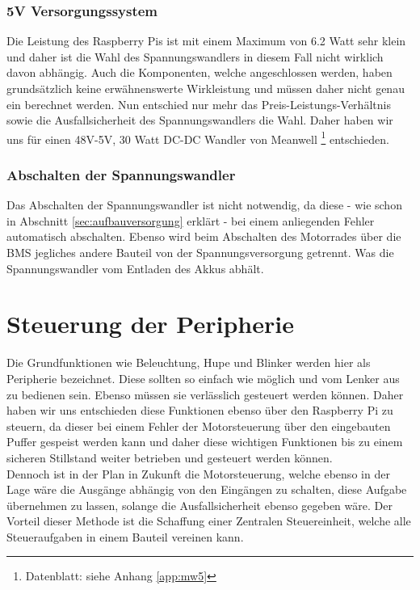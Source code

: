 \subsubsection{5V Versorgungssystem}

Die Leistung des Raspberry Pis ist mit einem Maximum von 6.2 Watt sehr klein und daher ist die Wahl des Spannungswandlers in diesem Fall nicht wirklich davon abhängig. Auch die Komponenten, welche angeschlossen werden, haben grundsätzlich keine erwähnenswerte Wirkleistung und müssen daher nicht genau ein berechnet werden. Nun entschied nur mehr das Preis-Leistungs-Verhältnis sowie die Ausfallsicherheit des Spannungswandlers die Wahl. Daher haben wir uns für einen 48V-5V, 30 Watt DC-DC Wandler von Meanwell \footnote{Datenblatt: siehe Anhang \ref{app:mw5}} entschieden.

\subsubsection{Abschalten der Spannungswandler}

Das Abschalten der Spannungswandler ist nicht notwendig, da diese - wie schon in Abschnitt \ref{sec:aufbauversorgung} erklärt - bei einem anliegenden Fehler automatisch abschalten.
Ebenso wird beim Abschalten des Motorrades über die BMS jegliches andere Bauteil von der Spannungsversorgung getrennt. Was die Spannungswandler vom Entladen des Akkus abhält.  

\newpage


\section{Steuerung der Peripherie}

Die Grundfunktionen wie Beleuchtung, Hupe und Blinker werden hier als Peripherie bezeichnet. Diese sollten so einfach wie möglich und vom Lenker aus zu bedienen sein. Ebenso müssen sie verlässlich gesteuert werden können. Daher haben wir uns entschieden diese Funktionen ebenso über den Raspberry Pi zu steuern, da dieser bei einem Fehler der Motorsteuerung über den eingebauten Puffer gespeist werden kann und daher diese wichtigen Funktionen bis zu einem sicheren Stillstand weiter betrieben und gesteuert werden können.\\


Dennoch ist in der Plan in Zukunft die Motorsteuerung, welche ebenso in der Lage wäre die Ausgänge abhängig von den Eingängen zu schalten, diese Aufgabe übernehmen zu lassen, solange die Ausfallsicherheit ebenso gegeben wäre. Der Vorteil dieser Methode ist die Schaffung einer Zentralen Steuereinheit, welche alle Steueraufgaben in einem Bauteil vereinen kann.

